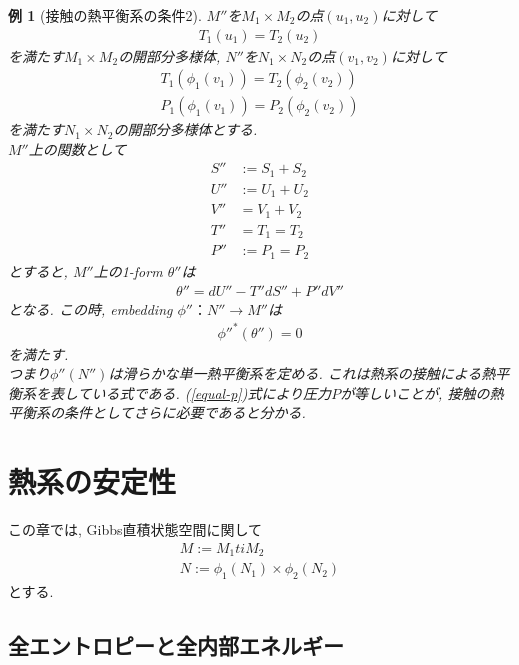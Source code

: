 \documentclass[a4paper,12pt]{ltjsarticle}
\theoremstyle{break}
\newtheorem{eg}[thm]{例}
\newcommand{\ti}{\times}
\numberwithin{equation}{section}
\begin{document}
\begin{eg}[接触の熱平衡系の条件2]
  $M''$を$M_1 \ti M_2$の点$(u_1,u_2)$に対して
  \begin{align*}
    T_1(u_1)=T_2(u_2)
  \end{align*}
  を満たす$M_1 \ti M_2$の開部分多様体, 
  $N''$を$N_1 \ti N_2$の点$(v_1,v_2)$に対して
  \begin{align}
    T_1(\phi_1(v_1))
    = T_2(\phi_2(v_2)) \\
    \label{equal-p}
    P_1(\phi_1(v_1))
    = P_2(\phi_2(v_2))
  \end{align}
  を満たす$N_1 \ti N_2$の開部分多様体とする. \\
  $M''$上の関数として
  \begin{align*}
    S'' &:=S_1+S_2 \\
    U'' &:=U_1+U_2 \\
    V'' &=V_1+V_2 \\
    T'' &=T_1=T_2 \\
    P'' &:=P_1=P_2 
  \end{align*}
  とすると, $M''$上の1-form $\theta''$は
  \begin{align*}
    \theta''
    =dU'' - T''dS'' + P''dV''
  \end{align*}
  となる. 
  この時, embedding $\phi''：N'' \to M''$は
  \begin{align*}
    \phi''^*(\theta'')
    = 0
  \end{align*}
  を満たす. \\
  つまり$\phi''(N'')$は滑らかな単一熱平衡系を定める. 
  これは熱系の接触による熱平衡系を表している式である.
  (\ref{equal-p})式により圧力$P$が等しいことが, 接触の熱平衡系の条件としてさらに必要であると分かる.  
\end{eg}

\newpage

\section{熱系の安定性}

この章では, Gibbs直積状態空間に関して
  \begin{align*}
    M:= M_1 ti M_2 \\
    N := \phi_1(N_1) \ti \phi_2(N_2)
  \end{align*}
  とする. 

\subsection{全エントロピーと全内部エネルギー}
\end{document}
